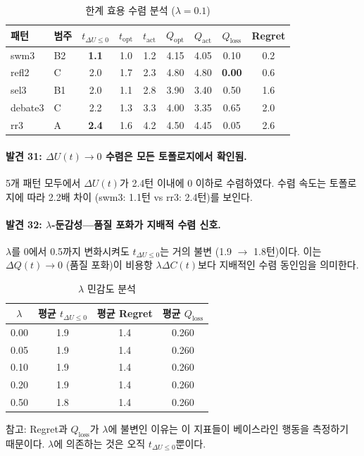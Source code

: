 \begin{table}[H]
\centering
\caption{한계 효용 수렴 분석 ($\lambda=0.1$)}
\label{tab:marginal-utility}
{\small
\begin{tabular}{llccccccc}
\toprule
패턴 & 범주 & $t_{\Delta U \leq 0}$ & $t_{\text{opt}}$ & $t_{\text{act}}$ & $Q_{\text{opt}}$ & $Q_{\text{act}}$ & $Q_{\text{loss}}$ & Regret \\
\midrule
swm3    & B2 & \textbf{1.1} & 1.0 & 1.2 & 4.15 & 4.05 & 0.10 & 0.2 \\
refl2   & C  & 2.0          & 1.7 & 2.3 & 4.80 & 4.80 & \textbf{0.00} & 0.6 \\
sel3    & B1 & 2.0          & 1.1 & 2.8 & 3.90 & 3.40 & 0.50 & 1.6 \\
debate3 & C  & 2.2          & 1.3 & 3.3 & 4.00 & 3.35 & 0.65 & 2.0 \\
rr3     & A  & \textbf{2.4} & 1.6 & 4.2 & 4.50 & 4.45 & 0.05 & 2.6 \\
\bottomrule
\end{tabular}
}
\end{table}

\paragraph{발견 31: $\Delta U(t) \to 0$ 수렴은 모든 토폴로지에서 확인됨.}
5개 패턴 모두에서 $\Delta U(t)$가 2.4턴 이내에 0 이하로 수렴하였다. 수렴 속도는 토폴로지에 따라 2.2배 차이 (swm3: 1.1턴 vs rr3: 2.4턴)를 보인다.

\paragraph{발견 32: $\lambda$-둔감성---품질 포화가 지배적 수렴 신호.}
$\lambda$를 0에서 0.5까지 변화시켜도 $t_{\Delta U \leq 0}$는 거의 불변 (1.9 $\to$ 1.8턴)이다. 이는 $\Delta Q(t) \to 0$ (품질 포화)이 비용항 $\lambda \Delta C(t)$보다 지배적인 수렴 동인임을 의미한다.

\begin{table}[H]
\centering
\caption{$\lambda$ 민감도 분석}
\label{tab:lambda-sensitivity}
{\small
\begin{tabular}{cccc}
\toprule
$\lambda$ & 평균 $t_{\Delta U \leq 0}$ & 평균 Regret & 평균 $Q_{\text{loss}}$ \\
\midrule
0.00 & 1.9 & 1.4 & 0.260 \\
0.05 & 1.9 & 1.4 & 0.260 \\
0.10 & 1.9 & 1.4 & 0.260 \\
0.20 & 1.9 & 1.4 & 0.260 \\
0.50 & 1.8 & 1.4 & 0.260 \\
\bottomrule
\end{tabular}
}

\smallskip
{\footnotesize 참고: Regret과 $Q_{\text{loss}}$가 $\lambda$에 불변인 이유는 이 지표들이 베이스라인 행동을 측정하기 때문이다. $\lambda$에 의존하는 것은 오직 $t_{\Delta U \leq 0}$뿐이다.}
\end{table}

